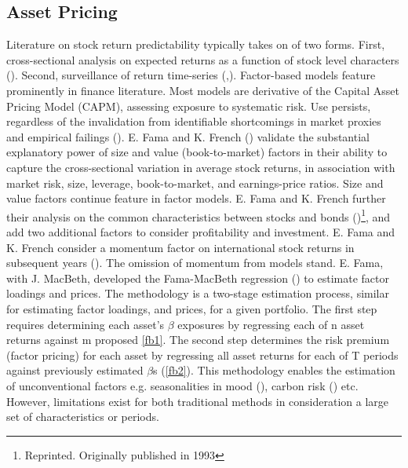 \documentclass[12pt]{article}
\begin{document}
\subsection{Asset Pricing}
Literature on stock return predictability typically takes on of two forms.
First, cross-sectional analysis on expected returns as a function of stock level characters (\cite{fama2008dissecting}).
Second, surveillance of return time-series (\cite{koijen2011predictability},\cite{rapach2013forecasting}).
Factor-based models feature prominently in finance literature.
Most models are derivative of the Capital Asset Pricing Model (CAPM), assessing exposure to systematic risk.
Use persists, regardless of the invalidation from identifiable shortcomings in market proxies and empirical failings (\cite{fama2004capital}).
E. Fama and K. French (\citeyear{eugene1992cross}) validate the substantial explanatory power of size and value (book-to-market) factors
in their ability to capture the cross-sectional variation in average stock returns, in association with market risk, size, leverage, book-to-market, and earnings-price ratios.
Size and value factors continue feature in factor models.
E. Fama and K. French further their analysis on the common characteristics between stocks and bonds (\cite{fama2021common})\footnote{Reprinted. Originally published in 1993},
and add two additional factors to consider profitability and investment.
E. Fama and K. French consider a momentum factor on international stock returns in subsequent years (\cite{fama2012size}).
The omission of momentum from models stand.
E. Fama, with J. MacBeth, developed the Fama-MacBeth regression (\cite{fama1973risk}) to estimate factor loadings and prices.
The methodology is a two-stage estimation process, similar for estimating factor loadings, and prices, for a given portfolio.
The first step requires determining each asset's $\beta$ exposures by regressing each of n asset returns against m proposed \ref{fb1}.
The second step determines the risk premium (factor pricing) for each asset by regressing all asset returns for each of T periods against previously estimated $\beta$s (\ref{fb2}).
This methodology enables the estimation of unconventional factors e.g. seasonalities in mood (\cite{hirshleifer2020mood}), carbon risk (\cite{bolton2021investors}) etc.
However, limitations exist for both traditional methods in consideration a large set of characteristics or periods.
\end{document}
